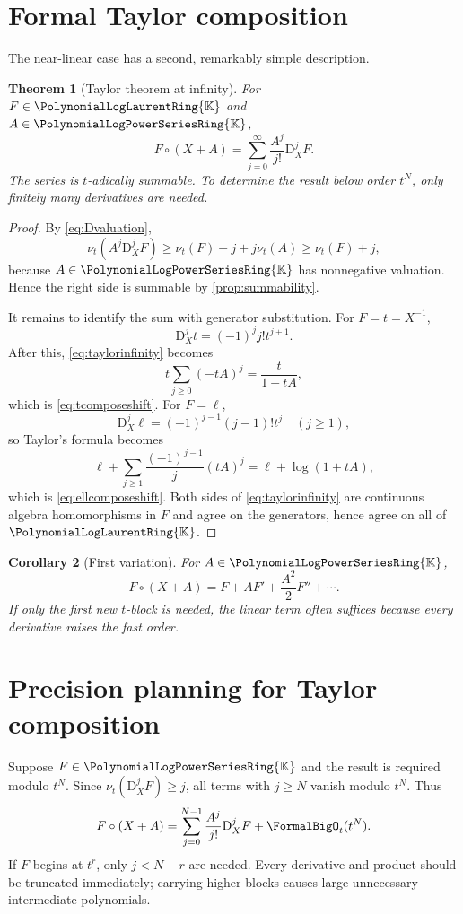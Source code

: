 \documentclass[11pt,oneside,openany]{book}
\newtheorem{theorem}{Theorem}[chapter]
\newtheorem{corollary}[theorem]{Corollary}
\newcommand{\K}{\mathbb{K}}
\newcommand{\Rring}{\PolynomialLogPowerSeriesRing{\K}}
\newcommand{\Pring}{\PolynomialLogLaurentRing{\K}}
\newcommand{\ordt}{\nu_t}
\newcommand{\compose}{\mathbin{\circ}}
\newcommand{\D}{\mathrm{D}}
\begin{document}
\section{Formal Taylor composition}
The near-linear case has a second, remarkably simple description.

\begin{theorem}[Taylor theorem at infinity]\label{thm:taylorinfinity}
For \(F\in\Pring\) and \(A\in\Rring\),
\begin{equation}\label{eq:taylorinfinity}
 F\compose(X+A)
 =\sum_{j=0}^{\infty}\frac{A^j}{j!}\D_X^jF.
\end{equation}
The series is \(t\)-adically summable.  To determine the result below order
\(t^N\), only finitely many derivatives are needed.
\end{theorem}

\begin{proof}
By \cref{eq:Dvaluation},
\[
 \ordt\!\left(A^j\D_X^jF\right)
 \geq \ordt(F)+j+j\ordt(A)
 \geq\ordt(F)+j,
\]
because \(A\in\Rring\) has nonnegative valuation.  Hence the right side is
summable by \cref{prop:summability}.

It remains to identify the sum with generator substitution.  For \(F=t=X^{-1}\),
\[
 \D_X^jt=(-1)^jj!t^{j+1}.
\]
After this, \cref{eq:taylorinfinity} becomes
\[
 t\sum_{j\geq0}(-tA)^j=\frac{t}{1+tA},
\]
which is \cref{eq:tcomposeshift}.  For \(F=\ell\),
\[
 \D_X^j\ell=(-1)^{j-1}(j-1)!t^j
 \quad(j\geq1),
\]
so Taylor's formula becomes
\[
 \ell+\sum_{j\geq1}\frac{(-1)^{j-1}}{j}(tA)^j
 =\ell+\log(1+tA),
\]
which is \cref{eq:ellcomposeshift}.  Both sides of
\cref{eq:taylorinfinity} are continuous algebra homomorphisms in \(F\) and
agree on the generators, hence agree on all of \(\Pring\).
\end{proof}

\begin{corollary}[First variation]\label{cor:firstvariation}
For \(A\in\Rring\),
\begin{equation}\label{eq:firstvariation}
 F\compose(X+A)
 =F+A F'+\frac{A^2}{2}F''+\cdots.
\end{equation}
If only the first new \(t\)-block is needed, the linear term often suffices
because every derivative raises the fast order.
\end{corollary}

\section{Precision planning for Taylor composition}
Suppose \(F\in\Rring\) and the result is required modulo \(t^N\).  Since
\(\ordt(\D_X^jF)\geq j\), all terms with \(j\geq N\) vanish modulo \(t^N\).
Thus
\begin{equation}\label{eq:taylorfiniteN}
 F\compose(X+A)
 =\sum_{j=0}^{N-1}\frac{A^j}{j!}\D_X^jF
   +\FormalBigO_t(t^N).
\end{equation}
If \(F\) begins at \(t^r\), only \(j<N-r\) are needed.  Every derivative and
product should be truncated immediately; carrying higher blocks causes large
unnecessary intermediate polynomials.
\end{document}
